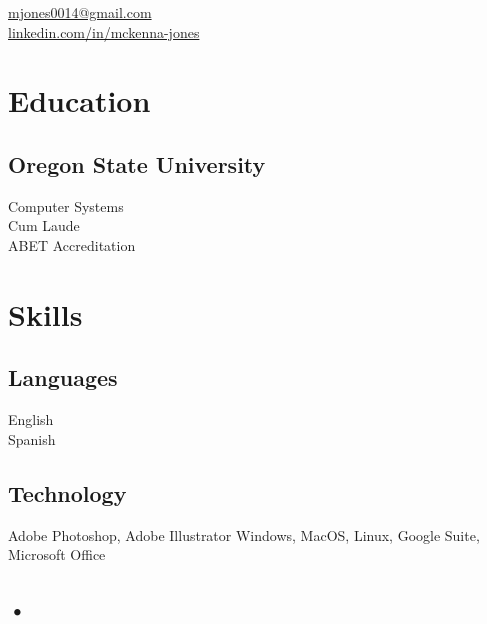\documentclass[]{hieudo-build}
\begin{document}
%
%
{
	\faEnvelope \href{mailto:mjones0014@gmail.com}{  mjones0014@gmail.com}\\
	\faLinkedinSquare \href{https://www.linkedin.com/in/mckenna-jones}{  linkedin.com/in/mckenna-jones}
}
    
%
%
\begin{minipage}[t]{0.25\textwidth} 

\section{Education} 

\subsection{Oregon State University}
Computer Systems \\
Cum Laude\\
ABET Accreditation \\

\vspace{20pt}
\section{Skills}

\subsection{Languages}
 English\\
 Spanish
\sectionsep

\subsection{Technology}
 Adobe Photoshop, Adobe Illustrator
 Windows, MacOS, Linux, Google Suite, Microsoft Office

\subsection{•}



\end{minipage}
\end{document}
